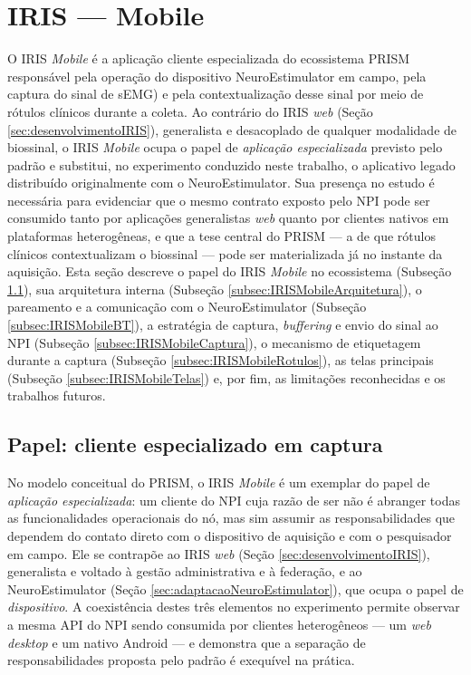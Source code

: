 \section{IRIS --- Mobile}\label{sec:desenvolvimentoIRISMobile}

O IRIS \textit{Mobile} \cite{prismIrisMobileRepo} é a aplicação cliente especializada do ecossistema PRISM responsável pela operação do dispositivo NeuroEstimulator em campo, pela captura do sinal de sEMG) e pela contextualização desse sinal por meio de rótulos clínicos durante a coleta. Ao contrário do IRIS \textit{web} (Seção \ref{sec:desenvolvimentoIRIS}), generalista e desacoplado de qualquer modalidade de biossinal, o IRIS \textit{Mobile} ocupa o papel de \textit{aplicação especializada} previsto pelo padrão e substitui, no experimento conduzido neste trabalho, o aplicativo legado distribuído originalmente com o NeuroEstimulator. Sua presença no estudo é necessária para evidenciar que o mesmo contrato exposto pelo NPI pode ser consumido tanto por aplicações generalistas \textit{web} quanto por clientes nativos em plataformas heterogêneas, e que a tese central do PRISM --- a de que rótulos clínicos contextualizam o biossinal --- pode ser materializada já no instante da aquisição. Esta seção descreve o papel do IRIS \textit{Mobile} no ecossistema (Subseção \ref{subsec:IRISMobilePapel}), sua arquitetura interna (Subseção \ref{subsec:IRISMobileArquitetura}), o pareamento e a comunicação com o NeuroEstimulator (Subseção \ref{subsec:IRISMobileBT}), a estratégia de captura, \textit{buffering} e envio do sinal ao NPI (Subseção \ref{subsec:IRISMobileCaptura}), o mecanismo de etiquetagem durante a captura (Subseção \ref{subsec:IRISMobileRotulos}), as telas principais (Subseção \ref{subsec:IRISMobileTelas}) e, por fim, as limitações reconhecidas e os trabalhos futuros.

\subsection{Papel: cliente especializado em captura}\label{subsec:IRISMobilePapel}

No modelo conceitual do PRISM, o IRIS \textit{Mobile} é um exemplar do papel de \textit{aplicação especializada}: um cliente do NPI cuja razão de ser não é abranger todas as funcionalidades operacionais do nó, mas sim assumir as responsabilidades que dependem do contato direto com o dispositivo de aquisição e com o pesquisador em campo. Ele se contrapõe ao IRIS \textit{web} (Seção \ref{sec:desenvolvimentoIRIS}), generalista e voltado à gestão administrativa e à federação, e ao NeuroEstimulator (Seção \ref{sec:adaptacaoNeuroEstimulator}), que ocupa o papel de \textit{dispositivo}. A coexistência destes três elementos no experimento permite observar a mesma API do NPI sendo consumida por clientes heterogêneos --- um \textit{web} \textit{desktop} e um nativo Android --- e demonstra que a separação de responsabilidades proposta pelo padrão é exequível na prática.

